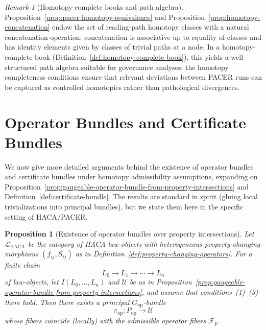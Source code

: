 \documentclass[11pt]{book}
\theoremstyle{plain}
\newtheorem{proposition}[theorem]{Proposition}
\theoremstyle{definition}
\theoremstyle{remark}
\newtheorem{remark}[theorem]{Remark}
\begin{document}
\begin{remark}[Homotopy-complete books and path algebra]
\label{rem:homotopy-complete-book-path-algebra}
Proposition~\ref{prop:pacer-homotopy-equivalence} and
Proposition~\ref{prop:homotopy-concatenation} endow the set of
reading-path homotopy classes with a natural concatenation operation:
concatenation is associative up to equality of classes and has
identity elements given by classes of trivial paths at a node. In a
homotopy-complete book (Definition~\ref{def:homotopy-complete-book}),
this yields a well-structured path algebra suitable for governance
analyses; the homotopy completeness conditions ensure that relevant
deviations between PACER runs can be captured as controlled
homotopies rather than pathological divergences.
\end{remark}

\section{Operator Bundles and Certificate Bundles}

We now give more detailed arguments behind the existence of operator
bundles and certificate bundles under homotopy admissibility
assumptions, expanding on
Proposition~\ref{prop:gaugeable-operator-bundle-from-property-intersections}
and Definition~\ref{def:certificate-bundle}. The results are standard
in spirit (gluing local trivializations into principal bundles), but
we state them here in the specific setting of HACA/PACER.

\begin{proposition}[Existence of operator bundles over property intersections]
\label{prop:operator-bundle-existence-proof}
Let $\mathcal{L}_{\mathrm{HACA}}$ be the category of HACA law-objects
with heterogeneous property-changing morphisms $(f_{ij},S_{ij})$ as in
Definition~\ref{def:property-changing-operators}. For a finite chain
\[
  L_0\to L_1\to\cdots\to L_n
\]
of law-objects, let $I(L_0,\dots,L_n)$ and $\mathcal{U}$ be as in
Proposition~\ref{prop:gaugeable-operator-bundle-from-property-intersections},
and assume that conditions~(1)--(3) there hold. Then there exists a
principal $G_{\mathrm{op}}$-bundle
\[
  \pi_{\mathrm{op}}:P_{\mathrm{op}}\to\mathcal{U}
\]
whose fibers coincide (locally) with the admissible operator fibers
$\mathcal{F}_p$.
\end{proposition}
\end{document}
